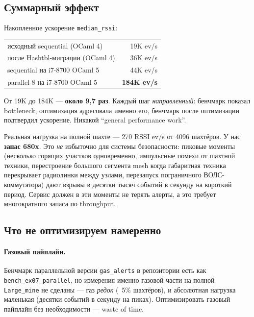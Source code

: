\subsection{Суммарный эффект}

Накопленное ускорение \texttt{median\_rssi}:

\begin{center}
\begin{tabular}{lr}
исходный sequential (OCaml 4)             & 19K ev/s \\
после Hashtbl-миграции (OCaml 4)          & ~36K ev/s \\
sequential на i7-8700 OCaml 5             & 44K ev/s \\
parallel-8 на i7-8700 OCaml 5             & \textbf{184K ev/s} \\
\end{tabular}
\end{center}

От 19K до 184K --- \textbf{около 9{,}7 раз}. Каждый шаг
\emph{направленный}: бенчмарк показал bottleneck, оптимизация
адресовала именно его, бенчмарк после оптимизации подтвердил
ускорение. Никакой ``general performance work''.

Реальная нагрузка на полной шахте --- 270 RSSI ev/s от 4096
шахтёров. У нас \textbf{запас 680x}. Это \emph{не} избыточно для
системы безопасности: пиковые моменты (несколько горящих участков
одновременно, импульсные помехи от шахтной техники, перестроение
большого сегмента mesh когда габаритная техника перекрывает
радиолинки между узлами, перезапуск пограничного
ВОЛС-коммутатора) дают
взрывы в десятки тысяч событий в секунду на короткий период.
Сервис должен в эти моменты не терять алерты, а это требует
многократного запаса по throughput.

\subsection{Что не оптимизируем намеренно}

\paragraph{Газовый пайплайн.} Бенчмарк параллельной версии
\texttt{gas\_alerts} в репозитории есть как \texttt{bench\_ex07\_parallel},
но измерения именно газовой части на полной \texttt{Large\_mine} не
сделаны --- газ \emph{редок} (~5\% шахтёров), и абсолютная нагрузка
маленькая (десятки событий в секунду на пиках). Оптимизировать
газовый пайплайн без необходимости --- waste of time.

